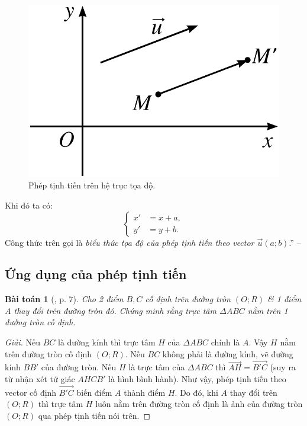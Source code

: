 \documentclass[oneside]{book}
\numberwithin{equation}{section}
\newtheorem{baitoan}{Bài toán}[section]
\begin{document}
\begin{figure}[H]
	\centering
	\includegraphics[scale=0.15]{phep_tinh_tien_tren_he_truc_toa_do}
	\caption{Phép tịnh tiến trên hệ trục tọa độ.}
	\label{fig:phep tinh tien tren he truc toa do}
\end{figure}
Khi đó ta có:
\begin{equation*}
	\boxed{\left\{\begin{split}
		x' &= x + a,\\
		y' &= y + b.
	\end{split}\right.}
\end{equation*}
Công thức trên gọi là \textit{biểu thức tọa độ của phép tịnh tiến theo vector $\vec{u}(a;b)$}.'' -- \cite[pp. 6--7]{SGK_Toan_11_hinh_hoc_nang_cao}

\subsection{Ứng dụng của phép tịnh tiến}

\begin{baitoan}[\cite{SGK_Toan_11_hinh_hoc_nang_cao}, p. 7]
	Cho 2 điểm $B,C$ cố định trên đường tròn $(O;R)$ \& 1 điểm $A$ thay đổi trên đường tròn đó. Chứng minh rằng trực tâm $\Delta ABC$ nằm trên 1 đường tròn cố định.
\end{baitoan}

\begin{proof}[Giải]
	Nếu $BC$ là đường kính thì trực tâm $H$ của $\Delta ABC$ chính là $A$. Vậy $H$ nằm trên đường tròn cố định $(O;R)$. Nếu $BC$ không phải là đường kính, vẽ đường kính $BB'$ của đường tròn. Nếu $H$ là trực tâm của $\Delta ABC$ thì $\overrightarrow{AH} = \overrightarrow{B'C}$ (suy ra từ nhận xét tứ giác $AHCB'$ là hình bình hành). Như vậy, phép tịnh tiến theo vector cố định $\overrightarrow{B'C}$ biến điểm $A$ thành điểm $H$. Do đó, khi $A$ thay đổi trên $(O;R)$ thì trực tâm $H$ luôn nằm trên đường tròn cố định là ảnh của đường tròn $(O;R)$ qua phép tịnh tiến nói trên.
\end{proof}
\end{document}
